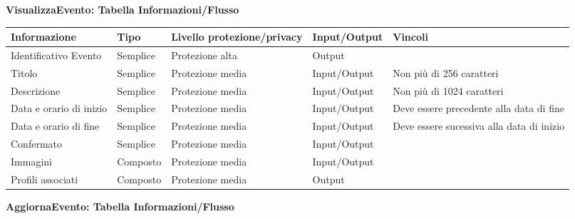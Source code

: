 \textbf{VisualizzaEvento: Tabella Informazioni/Flusso}
\hfill \break

\begin{tabular} {|P{3cm}|P{2.5cm}|P{3cm}|P{3cm}|P{3cm}|}
    \hline
    \textbf{Informazione}   & \textbf{Tipo} & \textbf{Livello protezione/privacy} & \textbf{Input/Output} & \textbf{Vincoli}                          \\
    \hline
    Identificativo Evento   & Semplice      & Protezione alta                     & Output                &                                           \\
    \hline
    Titolo                  & Semplice      & Protezione media                    & Input/Output          & Non più di 256 caratteri                  \\
    \hline
    Descrizione             & Semplice      & Protezione media                    & Input/Output          & Non più di 1024 caratteri                 \\
    \hline
    Data e orario di inizio & Semplice      & Protezione media                    & Input/Output          & Deve essere precedente alla data di fine  \\
    \hline
    Data e orario di fine   & Semplice      & Protezione media                    & Input/Output          & Deve essere sucessiva alla data di inizio \\
    \hline
    Confermato              & Semplice      & Protezione media                    & Input/Output          &                                           \\
    \hline
    Immagini                & Composto      & Protezione media                    & Input/Output          &                                           \\
    \hline
    Profili associati       & Composto      & Protezione media                    & Output                &                                           \\
    \hline
\end{tabular}
\hfill \break
\clearpage
\textbf{AggiornaEvento: Tabella Informazioni/Flusso}
\hfill \break

